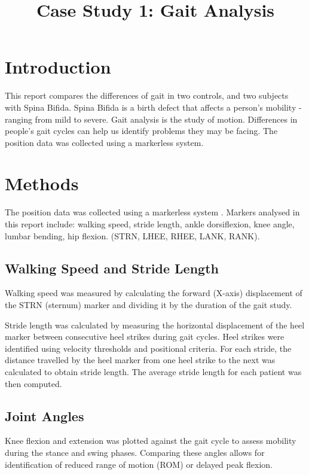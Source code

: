 \documentclass[conference]{IEEEtran}
\title{Case Study 1: Gait Analysis}
\date{}
\begin{document}
\justifying

\maketitle

\section{Introduction} %
This report compares the differences of gait in two controls, and two subjects with Spina Bifida. Spina Bifida is a birth defect that affects a person's mobility - ranging from mild to severe. Gait analysis is the study of motion. Differences in people's gait cycles can help us identify problems they may be facing. The position data was collected using a markerless system.

\section{Methods}\label{methods}

The position data was collected using a markerless system \cite{geerse2015kinematic}. Markers analysed in this report include: walking speed, stride length, ankle dorsiflexion, knee angle, lumbar bending, hip flexion. (STRN, LHEE, RHEE, LANK, RANK).

\subsection{Walking Speed and Stride Length}

Walking speed was measured by calculating the forward (X-axis) displacement of the STRN (sternum) marker and dividing it by the duration of the gait study.

Stride length was calculated by measuring the horizontal displacement of the heel marker between consecutive heel strikes during gait cycles. Heel strikes were identified using velocity thresholds and positional criteria. For each stride, the distance travelled by the heel marker from one heel strike to the next was calculated to obtain stride length. The average stride length for each patient was then computed.

\subsection{Joint Angles}

Knee flexion and extension was plotted against the gait cycle to assess mobility during the stance and swing phases. Comparing these angles allows for identification of reduced range of motion (ROM) or delayed peak flexion.
\end{document}
